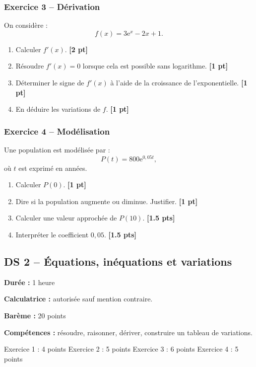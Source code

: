 \documentclass[11pt,a4paper]{article}
\newcommand{\e}{\mathrm{e}}
\newcommand{\pts}[1]{\hfill \textbf{[#1 pt]}}
\newcommand{\ptss}[1]{\hfill \textbf{[#1 pts]}}
\newcommand{\competences}[1]{\textbf{Compétences :} #1}
\newcommand{\calculatrice}{\textbf{Calculatrice :} autorisée sauf mention contraire.}
\newcommand{\duree}[1]{\textbf{Durée :} #1}
\newcommand{\bareme}[1]{\textbf{Barème :} #1}
\begin{document}
\subsubsection*{Exercice 3 -- Dérivation}

On considère :
\[
f(x)=3\e^x-2x+1.
\]
\begin{enumerate}
    \item Calculer $f'(x)$. \pts{2}
    \item Résoudre $f'(x)=0$ lorsque cela est possible sans logarithme. \pts{1}
    \item Déterminer le signe de $f'(x)$ à l'aide de la croissance de l'exponentielle. \pts{1}
    \item En déduire les variations de $f$. \pts{1}
\end{enumerate}

\subsubsection*{Exercice 4 -- Modélisation}

Une population est modélisée par :
\[
P(t)=800\e^{0,05t},
\]
où $t$ est exprimé en années.
\begin{enumerate}
    \item Calculer $P(0)$. \pts{1}
    \item Dire si la population augmente ou diminue. Justifier. \pts{1}
    \item Calculer une valeur approchée de $P(10)$. \ptss{1.5}
    \item Interpréter le coefficient $0,05$. \ptss{1.5}
\end{enumerate}

\newpage

\subsection*{DS 2 -- Équations, inéquations et variations}

\begin{sujetbox}
\duree{1 heure}

\calculatrice

\bareme{20 points}

\competences{résoudre, raisonner, dériver, construire un tableau de variations.}
\end{sujetbox}

\begin{baremebox}
Exercice 1 : 4 points \quad
Exercice 2 : 5 points \quad
Exercice 3 : 6 points \quad
Exercice 4 : 5 points
\end{baremebox}
\end{document}
